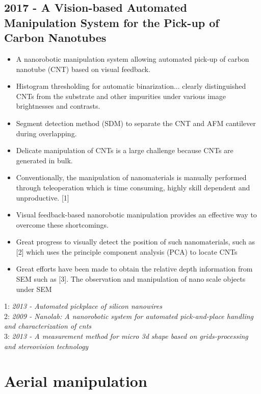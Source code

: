 \subsection{2017 - A Vision-based Automated Manipulation System for the Pick-up of Carbon Nanotubes}
\begin{itemize}
\item A nanorobotic manipulation system allowing automated pick-up of carbon nanotube (CNT) based on visual feedback.
\item Histogram thresholding for automatic binarization... clearly distinguished CNTs from the substrate and other impurities under various image brightnesses and contrasts.
\item Segment detection method (SDM) to separate the CNT
and AFM cantilever during overlapping.
\item Delicate manipulation of CNTs is a large challenge because CNTs are generated in bulk.
\item Conventionally, the manipulation of nanomaterials is manually performed through teleoperation which is time consuming, highly skill dependent and unproductive. [1]
\item Visual feedback-based nanorobotic manipulation
provides an effective way to overcome these shortcomings. 
\item Great progress to visually detect the position
of such nanomaterials, such as [2] which uses the principle component analysis (PCA) to locate CNTs
\item Great efforts have been made to obtain the relative depth information from SEM such as [3]. The observation and manipulation of nano scale objects under SEM
\end{itemize}
1: \textit{2013 - Automated pickplace of silicon nanowires} \\
2: \textit{2009 - Nanolab: A nanorobotic system for automated pick-and-place handling and characterization of cnts} \\
3: \textit{2013 - A measurement method for micro 3d shape
based on grids-processing and stereovision technology}


\section{Aerial manipulation}

